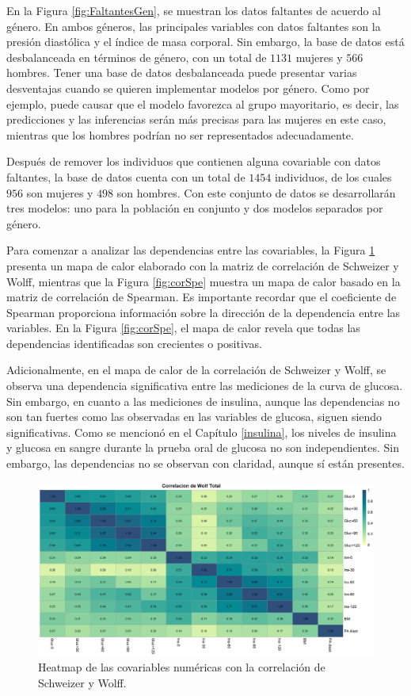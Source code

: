 En la Figura \ref{fig:FaltantesGen}, se muestran los datos faltantes de acuerdo al género. En ambos géneros, las principales variables con datos faltantes son la presión diastólica y el índice de masa corporal. Sin embargo, la base de datos está desbalanceada en términos de género, con un total de $1131$ mujeres y $566$ hombres. Tener una base de datos desbalanceada puede presentar varias desventajas cuando se quieren implementar modelos por género. Como por ejemplo, puede causar que el modelo favorezca al grupo mayoritario, es decir, las predicciones y las inferencias serán más precisas para las mujeres en este caso, mientras que los hombres podrían no ser representados adecuadamente.

Después de remover los individuos que contienen alguna covariable con datos faltantes, la base de datos cuenta con un total de $1454$ individuos, de los cuales $956$ son mujeres y $498$ son hombres. Con este conjunto de datos se desarrollarán tres modelos: uno para la población en conjunto y dos modelos separados por género.

Para comenzar a analizar las dependencias entre las covariables, la Figura \ref{fig:corrSWE} presenta un mapa de calor elaborado con la matriz de correlación de Schweizer y Wolff, mientras que la Figura \ref{fig:corSpe} muestra un mapa de calor basado en la matriz de correlación de Spearman. Es importante recordar que el coeficiente de Spearman proporciona información sobre la dirección de la dependencia entre las variables. En la Figura \ref{fig:corSpe}, el mapa de calor revela que todas las dependencias identificadas son crecientes o positivas.

Adicionalmente, en el mapa de calor de la correlación de Schweizer y Wolff, se observa una dependencia significativa entre las mediciones de la curva de glucosa. Sin embargo, en cuanto a las mediciones de insulina, aunque las dependencias no son tan fuertes como las observadas en las variables de glucosa, siguen siendo significativas. Como se mencionó en el Capítulo \ref{insulina}, los niveles de insulina y glucosa en sangre durante la prueba oral de glucosa no son independientes. Sin embargo, las dependencias no se observan con claridad, aunque sí están presentes. 

\begin{figure}[H]
    \centering
    \includegraphics[width = 0.9 \textwidth]{Imagenes/corWolfTotal.png}
    \caption{Heatmap de las covariables numéricas con la correlación de Schweizer y Wolff.}
    \label{fig:corrSWE}
\end{figure}

